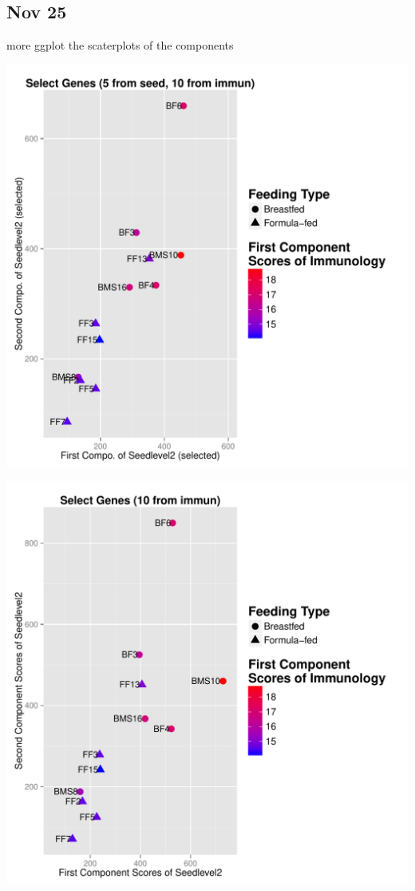 \documentclass{article}\usepackage[]{graphicx}\usepackage[]{color}
\makeatletter
\def\maxwidth{ %
  \ifdim\Gin@nat@width>\linewidth
    \linewidth
  \else
    \Gin@nat@width
  \fi
}
\makeatother
\begin{document}
 \subsection{Nov 25}
 more ggplot the scaterplots of the components
\begin{Schunk}


{\centering \includegraphics[width=\maxwidth]{figure/Nov_25-1} 

}



{\centering \includegraphics[width=\maxwidth]{figure/Nov_25-2} 

}
\end{Schunk}
\end{document}
